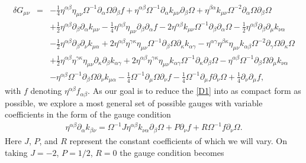 \begin{eqnarray}
\delta G_{\mu\nu}&=&- \tfrac{1}{4} \eta^{\alpha \beta} \eta_{\mu \nu} \Omega^{-1} \partial_{\alpha}\Omega \partial_{\beta}f + \eta^{\alpha \beta} \Omega^{-1} \partial_{\alpha}k_{\mu \nu} \partial_{\beta}\Omega + \eta^{\beta \alpha} k_{\mu \nu} \Omega^{-2} \partial_{\alpha}\Omega \partial_{\beta}\Omega  
\nonumber\\
&&+ \tfrac{1}{2} \eta^{\alpha \beta} \partial_{\beta}\partial_{\alpha}k_{\mu \nu} -  \tfrac{1}{4} \eta^{\alpha \beta} \eta_{\mu \nu} \partial_{\beta}\partial_{\alpha}f 
- 2 \eta^{\alpha \beta} k_{\mu \nu} \Omega^{-1} \partial_{\beta}\partial_{\alpha}\Omega -  \tfrac{1}{2} \eta^{\alpha \beta} \partial_{\beta}\partial_{\mu}k_{\nu \alpha}  
\nonumber\\
&&-  \tfrac{1}{2} \eta^{\alpha \beta} \partial_{\beta}\partial_{\nu}k_{\mu \alpha} + 2 \eta^{\alpha \beta} \eta^{\gamma \kappa} \eta_{\mu \nu} \Omega^{-1} \partial_{\beta}\Omega \partial_{\kappa}k_{\alpha \gamma} 
-  \eta^{\alpha \gamma} \eta^{\beta \kappa} \eta_{\mu \nu} k_{\alpha \beta} \Omega^{-2} \partial_{\gamma}\Omega \partial_{\kappa}\Omega 
\nonumber\\
&& + \tfrac{1}{2} \eta^{\alpha \beta} \eta^{\gamma \kappa} \eta_{\mu \nu} \partial_{\kappa}\partial_{\beta}k_{\alpha \gamma} + 2 \eta^{\alpha \beta} \eta^{\gamma \kappa} \eta_{\mu \nu} k_{\alpha \gamma} \Omega^{-1} \partial_{\kappa}\partial_{\beta}\Omega -  \eta^{\alpha \beta} \Omega^{-1} \partial_{\beta}\Omega \partial_{\mu}k_{\nu \alpha} 
\nonumber\\
&&-  \eta^{\alpha \beta} \Omega^{-1} \partial_{\beta}\Omega \partial_{\nu}k_{\mu \alpha} -  \tfrac{1}{4} \Omega^{-1} \partial_{\mu}\Omega \partial_{\nu}f -  \tfrac{1}{4} \Omega^{-1} \partial_{\mu}f \partial_{\nu}\Omega + \tfrac{1}{4} \partial_{\nu}\partial_{\mu}f,
\label{D1}
\end{eqnarray}
%
with $f$ denoting $\eta^{\alpha\beta}f_{\alpha\beta}$. As our goal is to reduce the \eqref{D1} into as compact form as possible, we explore a most general set of possible gauges with variable coefficients in the form of the gauge condition
%
\begin{eqnarray}
\eta^{\alpha\beta}\partial_{\alpha}k_{\beta\nu} = \Omega^{-1} J \eta^{\alpha\beta}k_{\nu\alpha}\partial_\beta \Omega + P \partial_\nu f+ R \Omega^{-1} f\partial_\nu \Omega.
\label{D2}
\end{eqnarray}
%
Here $J$, $P$, and $R$ represent the constant coefficients of which we will vary. On taking  $J = -2$, $P = 1/2$, $R = 0$ the gauge condition becomes
